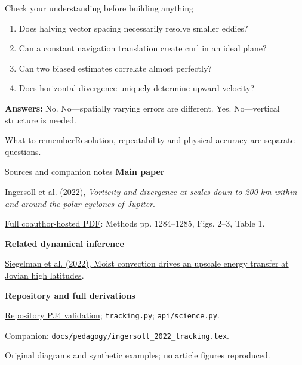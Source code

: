 \documentclass[aspectratio=169,11pt]{beamer}
\newcommand{\prov}{}
\newcommand{\evidence}[1]{\gdef\prov{#1}}
\newcommand{\takeaway}[1]{\vspace{0.3em}\begin{block}{What to remember}#1\end{block}}
\newcommand{\paperlink}{\href{https://doi.org/10.1038/s41550-022-01774-0}{Ingersoll et al. (2022)}}
\newcommand{\repolink}{\href{https://github.com/ksr-ocean/jiram_catalog/blob/a6e3938e5c816583c49833791f7500e562acf155/docs/reports/tracking_pj4.md}{Repository PJ4 validation}}
\begin{document}
\evidence{Original learning checkpoint. Answers follow from the synthetic derivations in this deck.}
\begin{frame}{Check your understanding before building anything}
 \begin{enumerate}
  \item Does halving vector spacing necessarily resolve smaller eddies?
  \item Can a constant navigation translation create curl in an ideal plane?
  \item Can two biased estimates correlate almost perfectly?
  \item Does horizontal divergence uniquely determine upward velocity?
 \end{enumerate}
 \vspace{0.5cm}
 \small\textbf{Answers:} No. No---spatially varying errors are different.
 Yes. No---vertical structure is needed.
 \takeaway{Resolution, repeatability and physical accuracy are separate questions.}
\end{frame}

\evidence{Source and reproducibility record. The main article was read in full, including Methods.}
\begin{frame}{Sources and companion notes}
 \small
 \textbf{Main paper}\par
 \paperlink{}, \emph{Vorticity and divergence at scales down to 200 km
 within and around the polar cyclones of Jupiter}.\par
 \href{https://pordlabs.ucsd.edu/wryoung/reprintPDFs/VortDiv.pdf}{Full coauthor-hosted PDF}:
 Methods pp. 1284--1285, Figs. 2--3, Table 1.
 \par\medskip
 \textbf{Related dynamical inference}\par
 \href{https://doi.org/10.1038/s41567-021-01458-y}{Siegelman et al. (2022),
 Moist convection drives an upscale energy transfer at Jovian high latitudes}.
 \par\medskip
 \textbf{Repository and full derivations}\par
 \repolink{}; \texttt{tracking.py}; \texttt{api/science.py}.\par
 Companion: \texttt{docs/pedagogy/ingersoll\_2022\_tracking.tex}.
 \par\medskip
 Original diagrams and synthetic examples; no article figures reproduced.
\end{frame}
\end{document}
